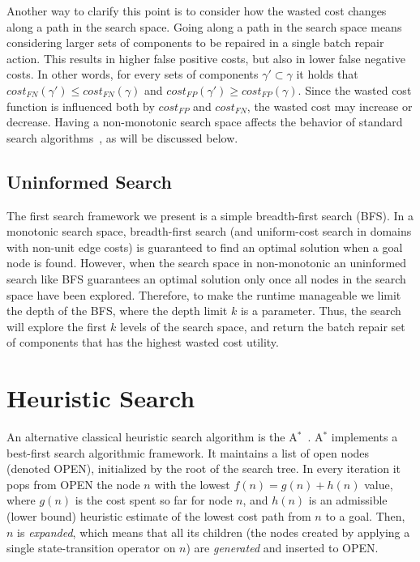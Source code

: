 \documentclass[a4paper,11pt]{report}
\newcommand\roni[1]{\textcolor{green}{roni: #1}}
\newcommand{\astar}{A$^*$}
\begin{document}
Another way to clarify this point is to consider how the wasted cost changes along a path in the search space. 
Going along a path in the search space means considering larger sets of components to be repaired in a single batch repair action. This results in higher false positive costs, but also in lower false negative costs.
In other words, for every sets of components $\gamma' \subset \gamma$
it holds that $cost_{FN}(\gamma')\leq cost_{FN}(\gamma)$ 
and $cost_{FP}(\gamma')\geq cost_{FP}(\gamma)$. Since the wasted cost function is influenced both by $cost_{FP}$ and $cost_{FN}$, the wasted cost may increase or decrease. 
Having a non-monotonic search space affects the behavior of standard search algorithms~\cite{stern2014max}, as will be discussed below. 

\subsection{Uninformed Search}
The first search framework we present is a simple breadth-first search (BFS). 
In a monotonic search space, breadth-first search (and uniform-cost search in domains with non-unit edge costs) 
is guaranteed to find an optimal solution when a goal node is found. However, when the search space in non-monotonic an uninformed search like BFS guarantees an optimal solution only once all nodes in the search space have been explored. 
Therefore, to make the runtime manageable we limit the depth of the BFS, where the depth limit $k$ is a parameter. 
Thus, the search will explore the first $k$ levels of the search space, and return the batch repair set of components that has the highest wasted cost utility. 

\section{Heuristic Search}
An alternative classical heuristic search algorithm is the \astar{}~\cite{hart1968formal}. 
\astar{} implements a best-first search algorithmic framework. 
It maintains a list of open nodes (denoted OPEN), initialized by the root of the search tree. 
In every iteration it pops from OPEN the node $n$ with the lowest $f(n)=g(n)+h(n)$ value, 
where $g(n)$ is the cost spent so far for node $n$, and $h(n)$ is an admissible (lower bound) heuristic estimate of the lowest cost path from $n$ to a goal. Then, $n$ is {\em expanded}, which means that all its children (the nodes created by applying a single state-transition operator on $n$) 
are {\em generated} and inserted to OPEN.
\end{document}
